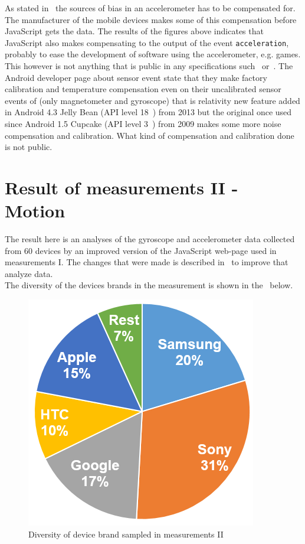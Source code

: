 As stated in~\cite{acc:kionixerr} the sources of bias in an accelerometer has to be compensated for. The manufacturer of the mobile devices makes some of this compensation before JavaScript gets the data. The results of the figures above indicates that JavaScript also makes compensating to the output of the event \texttt{acceleration}, probably to ease the development of software using the accelerometer, e.g. games. This however is not anything that is public in any specifications such~\cite{sensor:W3Cspec} or~\cite{sensor:accIncludingGravity}. The Android developer page about sensor event \cite{android:sensorEvent} state that they make factory calibration and temperature compensation even on their uncalibrated sensor events of (only magnetometer and gyroscope) that is relativity new feature added in Android 4.3 Jelly Bean (API level 18~\cite{android:API18}) from 2013 but the original once used since Android 1.5 Cupcake (API level 3~\cite{android:API3}) from 2009 makes some more noise compensation and calibration. What kind of compensation and calibration done is not public. 

\section{Result of measurements II  - Motion}\label{res:testII}
The result here is an analyses of the gyroscope and accelerometer data collected from 60 devices by an improved version of the JavaScript web-page used in measurements I. The changes that were made is described in~ to improve that analyze data. \\
The diversity of the devices brands in the measurement is shown in the~ below.
\begin{figure}[H]
	\centering
	\includegraphics[scale=.4]{img/measure2-brands}
	\caption{Diversity of device brand sampled in measurements II}
	\label{fig:brandII}
\end{figure}


